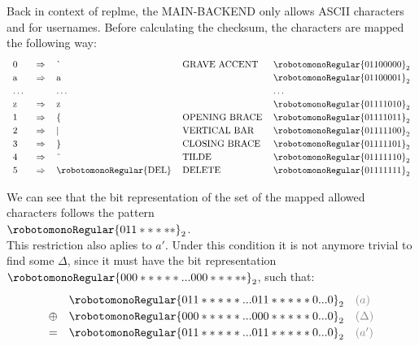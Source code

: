 \documentclass[10pt]{article}
\begin{document}
Back in context of replme, the MAIN-BACKEND only allows ASCII characters  and  for usernames. Before calculating the checksum, the characters are mapped the following way:
\begin{equation}
	\label{eq:char-mapping}
	\begin{tabular}{l l l l l}
		0       & $\Rightarrow$ & \`\                     & GRAVE ACCENT  & $\robotomonoRegular{01100000}_2$ \\
		a       & $\Rightarrow$ & a                       &               & $\robotomonoRegular{01100001}_2$ \\
		$\dots$ &               & $\dots$                 &               & $\dots$                          \\
		z       & $\Rightarrow$ & z                       &               & $\robotomonoRegular{01111010}_2$ \\
		1       & $\Rightarrow$ & \{                      & OPENING BRACE & $\robotomonoRegular{01111011}_2$ \\
		2       & $\Rightarrow$ & |                       & VERTICAL BAR  & $\robotomonoRegular{01111100}_2$ \\
		3       & $\Rightarrow$ & \}                      & CLOSING BRACE & $\robotomonoRegular{01111101}_2$ \\
		4       & $\Rightarrow$ & \~{}                    & TILDE         & $\robotomonoRegular{01111110}_2$ \\
		5       & $\Rightarrow$ & \robotomonoRegular{DEL} & DELETE        & $\robotomonoRegular{01111111}_2$
	\end{tabular}
\end{equation}

We can see that the bit representation of the set of the mapped allowed characters follows the pattern\\ $\robotomonoRegular{011*****}_2$. \\

This restriction also aplies to $a'$. Under this condition it is not anymore trivial to find some $\Delta$, since it must have the bit representation $\robotomonoRegular{000*****...000*****}_2$, such that:
\begin{equation}
	\def\arraystretch{1.2}
	\begin{array}{lll}
		       & \robotomonoRegular{011*****...011***** 0...0}_2 & \color{gray}(a)      \\
		\oplus & \robotomonoRegular{000*****...000***** 0...0}_2 & \color{gray}(\Delta) \\
		=      & \robotomonoRegular{011*****...011***** 0...0}_2 & \color{gray}(a')     \\
	\end{array}
\end{equation}
\end{document}
